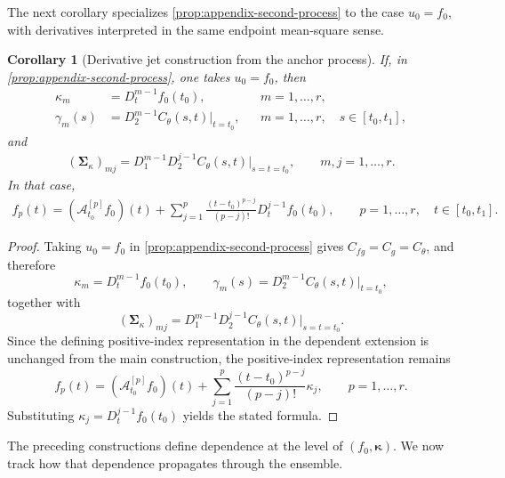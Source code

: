\documentclass[11pt,a4paper]{article}
\newtheorem{corollary}{Corollary}
\theoremstyle{definition}
\theoremstyle{remark}
\begin{document}
The next corollary specializes \cref{prop:appendix-second-process} to the case \(u_0=f_0\), with derivatives interpreted in the same endpoint mean-square sense.

\begin{corollary}[Derivative jet construction from the anchor process]\label{cor:appendix-self-referential}
If, in \cref{prop:appendix-second-process}, one takes \(u_0=f_0\), then
\begin{align*}
\kappa_m&=D_t^{m-1}f_0(t_0), && m=1,\ldots,r,\\
\gamma_m(s)&=D_2^{m-1}C_\theta(s,t)\big|_{t=t_0}, && m=1,\ldots,r,\quad s\in[t_0,t_1],
\end{align*}
and
\begin{align*}
(\boldsymbol{\Sigma}_{\kappa})_{mj}=D_1^{m-1}D_2^{j-1}C_\theta(s,t)\big|_{s=t=t_0},
\qquad m,j=1,\ldots,r.
\end{align*}
In that case,
\begin{align*}
f_p(t)=(\mathcal A_{t_0}^{[p]}f_0)(t)+\sum_{j=1}^{p}\frac{(t-t_0)^{p-j}}{(p-j)!}D_t^{j-1}f_0(t_0),
\qquad p=1,\ldots,r,\quad t\in[t_0,t_1].
\end{align*}
\end{corollary}

\begin{proof}
Taking $u_0=f_0$ in \cref{prop:appendix-second-process} gives $C_{fg}=C_g=C_\theta$, and therefore
\[
\kappa_m=D_t^{m-1}f_0(t_0),\qquad
\gamma_m(s)=D_2^{m-1}C_\theta(s,t)\big|_{t=t_0},
\]
together with
\[
(\boldsymbol{\Sigma}_{\kappa})_{mj}=D_1^{m-1}D_2^{j-1}C_\theta(s,t)\big|_{s=t=t_0}.
\]
Since the defining positive-index representation in the dependent extension is unchanged from the main construction, the positive-index representation remains
\[
f_p(t)=(\mathcal A_{t_0}^{[p]}f_0)(t)+\sum_{j=1}^{p}\frac{(t-t_0)^{p-j}}{(p-j)!}\kappa_j,
\qquad p=1,\ldots,r.
\]
Substituting \(\kappa_j=D_t^{j-1}f_0(t_0)\) yields the stated formula.
\end{proof}



The preceding constructions define dependence at the level of \((f_0,\boldsymbol{\kappa})\). We now track how that dependence propagates through the ensemble.
\end{document}
